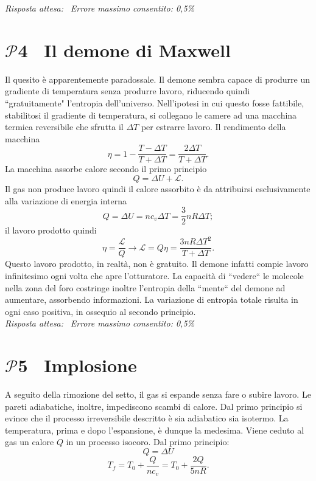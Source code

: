 \documentclass[a4paper,12pt]{article}
\newcommand{\problemtitle}[1]{
  \noindent
  \textbf{\Large #1}\hspace{0.5em}
  \raisebox{0.6ex}{\rule{\linewidth - \widthof{\textbf{\Large #1}} - 0.6em}{0.4pt}}%
}
\begin{document}
\textit{Risposta attesa:}  \, \textit{Errore massimo consentito: 0,5\%}

\section*{\problemtitle{$\mathcal{P}${\small{4}} \ Il demone di Maxwell}}
Il quesito è apparentemente paradossale. Il demone sembra capace di produrre un gradiente di temperatura senza produrre lavoro, riducendo quindi “gratuitamente" l'entropia dell'universo. Nell'ipotesi in cui questo fosse fattibile, stabilitosi il gradiente di temperatura, si collegano le camere ad una macchina termica reversibile che sfrutta il $\Delta T$ per estrarre lavoro. Il rendimento della macchina 
\[
\eta = 1 - \frac{T-\Delta T}{T + \Delta T} = \frac{2\Delta T}{T+\Delta T}. 
\]
La macchina assorbe calore secondo il primo principio
\[
Q = \Delta U + \mathcal{L}.
\]
Il gas non produce lavoro quindi il calore assorbito è da attribuirsi esclusivamente alla variazione di energia interna
\[
Q = \Delta U = nc_v\Delta T = \frac{3}{2}nR\Delta T;
\]
il lavoro prodotto quindi
\[
\eta = \frac{\mathcal{L}}{Q} \rightarrow \mathcal{L} = Q\eta =  \frac{3nR\Delta T^2}{T+\Delta T}.
\]
Questo lavoro prodotto, in realtà, non è gratuito. Il demone infatti compie lavoro infinitesimo ogni volta che apre l'otturatore. La capacità di “vedere“ le molecole nella zona del foro costringe inoltre l'entropia della “mente“ del demone ad aumentare, assorbendo informazioni. La variazione di entropia totale risulta in ogni caso positiva, in ossequio al secondo principio. \\

\textit{Risposta attesa:}  \, \textit{Errore massimo consentito: 0,5\%}

\section*{\problemtitle{$\mathcal{P}${\small{5}} \ Implosione}}
A seguito della rimozione del setto, il gas si espande senza fare o subire lavoro. Le pareti adiabatiche, inoltre, impediscono scambi di calore. Dal primo principio si evince che il processo irreversibile descritto è sia adiabatico sia isotermo. La temperatura, prima e dopo l'espansione, è dunque la medesima. Viene ceduto al gas un calore $Q$ in un processo isocoro. Dal primo principio:
\[
Q = \Delta U 
\] 
\[
T_f = T_0 + \frac{Q}{nc_v} = T_0 + \frac{2Q}{5nR}.
\]
\end{document}
